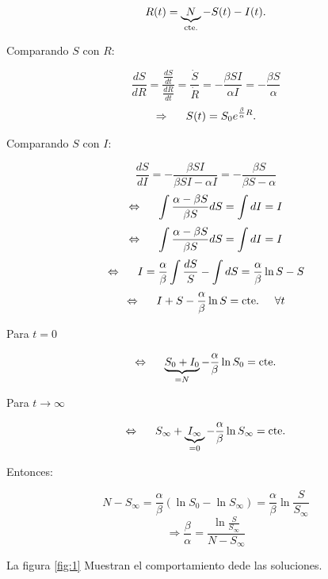 \documentclass[10pt,oneside]{article}
\theoremstyle{definition}
\begin{document}
\begin{multicols}{2}
     \begin{equation}\label{eq:5}
         R(t)=\underbrace{N}_{\textnormal{cte.}}-S(t)-I(t).
     \end{equation}

     Comparando $S$ con $R$:

     $$\frac{dS}{dR}=\frac{\frac{dS}{dt}}{\frac{dR}{dt}}=\frac{\dot S}{\dot R}=-\frac{\beta SI}{\alpha I}=-\frac{\beta S}{\alpha}$$ $$\Rightarrow\hspace{0.5cm} S(t)=S_0 e^{\frac{\beta}{\alpha} R}.$$

     Comparando $S$ con $I$:

      $$\frac{dS}{dI}=-\frac{\beta SI}{\beta SI-\alpha I}=-\frac{\beta S}{\beta S-\alpha }$$
      $$\Leftrightarrow\hspace{0.5cm}\int \frac{\alpha-\beta S}{\beta S}dS=\int dI =I$$
      $$\Leftrightarrow\hspace{0.5cm}\int \frac{\alpha-\beta S}{\beta S}dS=\int dI =I$$
      $$\Leftrightarrow\hspace{0.5cm}I=\frac{\alpha}{\beta}\int\frac{dS}{S}-\int dS=\frac{\alpha}{\beta}\ln S-S$$
      $$\Leftrightarrow\hspace{0.5cm} I+S-\frac{\alpha}{\beta}\ln S=\textnormal{cte.} \hspace{0.5cm} \forall t$$

      Para $t=0$
      
      $$\Leftrightarrow\hspace{0.5cm} \underbrace{S_0+I_0}_{=N}-\frac{\alpha}{\beta}\ln S_0= \textnormal{cte.}$$

      Para $t\to \infty$

      $$\Leftrightarrow\hspace{0.5cm} S_{\infty}+\underbrace{I_{\infty}}_{=0}-\frac{\alpha}{\beta}\ln S_{\infty}= \textnormal{cte.}$$

      Entonces:

      $$N-S_{\infty}=\frac{\alpha}{\beta}(\ln S_0-\ln S_{\infty})=\frac{\alpha}{\beta}\ln \frac{S}{S_{\infty}} $$
      $$ \Rightarrow \frac{\beta}{\alpha}=\frac{\ln \frac{S}{S_{\infty}}}{N-S_{\infty}} $$

      La figura \ref{fig:1} Muestran el comportamiento dede las soluciones.
      

\end{multicols}
\end{document}

